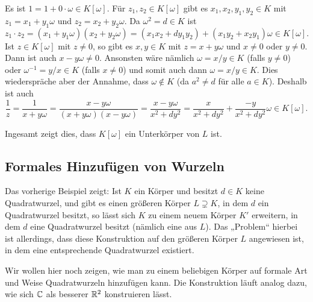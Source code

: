 Es ist $1 = 1 + 0 \cdot \omega \in K[\omega]$. Für $z_1, z_2 \in K[\omega]$ gibt es $x_1, x_2, y_1, y_2 \in K$ mit $z_1 = x_1 + y_1 \omega$ und $z_2 = x_2 + y_2 \omega$. Da $\omega^2 = d \in K$ ist
\[
 z_1 \cdot z_2
 = (x_1 + y_1 \omega) (x_2 + y_2 \omega)
 = (x_1 x_2 + d y_1 y_2) + (x_1 y_2 + x_2 y_1) \omega
 \in K[\omega].
\]
Ist $z \in K[\omega]$ mit $z \neq 0$, so gibt es $x,y \in K$ mit $z = x+y\omega$ und $x \neq 0$ oder $y \neq 0$. Dann ist auch $x-y\omega \neq 0$. Ansonsten wäre nämlich $\omega = x/y \in K$ (falls $y \neq 0$) oder $\omega^{-1} = y/x \in K$ (falls $x \neq 0$) und somit auch dann $\omega = x/y \in K$. Dies wiederspräche aber der Annahme, dass $\omega \notin K$ (da $a^2 \neq d$ für alle $a \in K$). Deshalb ist auch
\[
 \frac{1}{z}
 = \frac{1}{x+y\omega}
 = \frac{x-y\omega}{(x+y\omega)(x-y\omega)}
 = \frac{x-y\omega}{x^2 + dy^2}
 = \frac{x}{x^2 + dy^2} + \frac{-y}{x^2 + dy^2}\omega \in K[\omega].
\]

Ingesamt zeigt dies, dass $K[\omega]$ ein Unterkörper von $L$ ist.


\subsection{Formales Hinzufügen von Wurzeln}
Das vorherige Beispiel zeigt: Ist $K$ ein Körper und besitzt $d \in K$ keine Quadratwurzel, und gibt es einen größeren Körper $L \supsetneq K$, in dem $d$ ein Quadratwurzel besitzt, so lässt sich $K$ zu einem neuem Körper $K'$ erweitern, in dem $d$ eine Quadratwurzel besitzt (nämlich eine aus $L$). Das „Problem“ hierbei ist allerdings, dass diese Konstruktion auf den größeren Körper $L$ angewiesen ist, in dem eine entsprechende Quadratwurzel existiert.

Wir wollen hier noch zeigen, wie man zu einem beliebigen Körper auf formale Art und Weise Quadratwurzeln hinzufügen kann. Die Konstruktion läuft analog dazu, wie sich $\mathbb{C}$ als besserer $\mathbb{R}^2$ konstruieren lässt.

